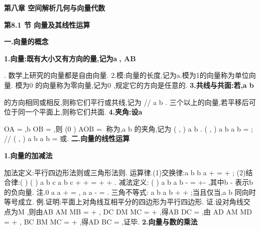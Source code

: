 \begin{center}
{\Large \bfseries \textcolor{lyred}{第八章 空间解析几何与向量代数}}
\end{center}

\vspace{6pt}
{\large \bfseries \textcolor{lyred}{第8.1 节 向量及其线性运算}}

\vspace{4pt}
{\bfseries \textcolor{lyred}{一.向量的概念}}

{\bfseries \textcolor{lyred}{1.向量:既有大小又有方向的量,记为a, AB}}

\xi \xi \xi \rho 
. 
数学上研究的向量都是\textcolor{lyred}{自由向量}. 
\textcolor{lyred}{2.模}:向量的长度,记为a\rho .模为1的向量称为\textcolor{lyred}{单位向量}. 
模为0 的向量称为\textcolor{lyred}{零向量},记为0
\rho 
,规定它的方向是任意的. 
{\bfseries \textcolor{lyred}{3.共线与共面:若,a b}}

\rho 
\rho 
的方向相同或相反,则称它们\textcolor{lyred}{平行}或\textcolor{lyred}{共线},记为
//
a
b
\rho 
\rho 
. 
三个以上的向量,若平移后可位于同一个平面上,则称它们\textcolor{lyred}{共面}. 
{\bfseries \textcolor{lyred}{4.夹角:设a}}

OA
=
\xi \xi \xi \rho 
\rho 
,b
OB
=
\xi \xi \xi \rho 
\rho 
,则
(0
)
AOB
\varphi 
\varphi 
\pi 
=
\le 
\le 
称为,a b
\rho 
\rho 
的\textcolor{lyred}{夹角},记为\cdot 
( , )
a b
\rho 
\rho 
. 
\cdot 
( , )
a
b
a b
\pi 
\bot
\Leftrightarrow 
=
\rho 
\rho 
\rho 
\rho 
;
\cdot 
//
( , )
a
b
a b
\Leftrightarrow 
=
\rho 
\rho 
\rho 
\rho 
或\pi . 
\vspace{4pt}
{\bfseries \textcolor{lyred}{二.向量的线性运算}}

{\bfseries \textcolor{lyred}{1.向量的加减法}}

\textcolor{lyred}{加法定义}:平行四边形法则或三角形法则. 
\textcolor{lyred}{运算律}.(1)\textcolor{lyred}{交换律}:a
b
b
a
+
=
+
\rho 
\rho 
\rho 
\rho ; 
(2)\textcolor{lyred}{结合律}:(
)
(
)
a
b
c
a
b
c
+
+
=
+
+
\rho 
\rho 
\rho 
\rho 
\rho 
\rho . 
\textcolor{lyred}{减法定义}:
(
)
a
b
a
b
-
=
+-
\rho 
\rho 
\rho 
\rho 
,其中b
-
\rho 
表示b
\rho 
的\textcolor{lyred}{负向量}. 
\textcolor{lyred}{注}.0
a
a
+
=
\rho 
\rho 
\rho ,
a
a
-
=
\rho 
\rho 
\rho 
. 
\textcolor{lyred}{三角不等式}: a
b
a
b
+
\le 
+
\rho 
\rho 
\rho 
\rho 
;当且仅当,a b
\rho 
\rho 
同向时等号成立. 
\textcolor{lyred}{例}.证明:平面上对角线互相平分的四边形为平行四边形. 
证.设对角线交点为M ,则由AB
AM
MB
=
+
\xi \xi \xi \rho 
\xi \xi \xi \xi \rho 
\xi \xi \xi \rho 
, DC
DM
MC
=
+
\xi \xi \xi \rho 
\xi \xi \xi \xi \rho 
\xi \xi \xi \xi \rho 
,得AB
DC
=
\xi \xi \xi \rho 
\xi \xi \xi \rho 
,由 
AD
AM
MD
=
+
\xi \xi \xi \rho 
\xi \xi \xi \xi \rho 
\xi \xi \xi \xi \rho 
, BC
BM
MC
=
+
\xi \xi \xi \rho 
\xi \xi \xi \xi \rho 
\xi \xi \xi \xi \rho 
,得AD
BC
=
\xi \xi \xi \rho 
\xi \xi \xi \rho 
,证毕. 
{\bfseries \textcolor{lyred}{2.向量与数的乘法}}


